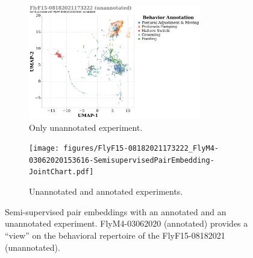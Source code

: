 \begin{figure}[htb!]
	\centering
	\begin{subfigure}[b]{0.5\linewidth}
		\centering\includegraphics[height=5cm]{figures/FlyF15-08182021173222_FlyM4-03062020153616-SemisupervisedPairEmbedding.pdf}
		\caption{Only unannotated experiment.}
	\end{subfigure}%
	\hfill
	\centering
	\begin{subfigure}[b]{0.5\linewidth}
		\centering\texttt{[image: figures/FlyF15-08182021173222\_FlyM4-03062020153616-SemisupervisedPairEmbedding-JointChart.pdf]}
		\caption{Unannotated and annotated experiments.}
	\end{subfigure}%
	\caption[Semi-supervised pair embeddings with an annotated and an unannotated experiment.]{Semi-supervised pair embeddings with an annotated and an unannotated experiment. FlyM4-03062020 (annotated) provides a ``view'' on the behavioral repertoire of the FlyF15-08182021 (unannotated).}
\end{figure}

